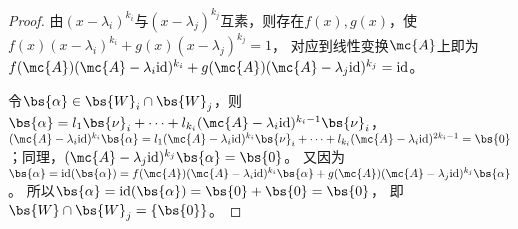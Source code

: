 \documentclass[12pt, a4paper, oneside, UTF8]{ctexbook}
\begin{document}
\begin{proof}
    由$(x-\lambda_i)^{k_i}$与$(x-\lambda_j)^{k_j}$互素，则存在$f(x),g(x)$，使$f(x)(x-\lambda_i)^{k_i}+g(x)(x-\lambda_j)^{k_j}=1$，
    对应到线性变换$\mc{A}$上即为$f(\mc{A})(\mc{A}-\lambda_i\mathrm{id})^{k_i}+g(\mc{A})(\mc{A}-\lambda_j\mathrm{id})^{k_j}=\mathrm{id}$。
    
    令$\bs{\alpha} \in \bs{W}_i \cap \bs{W}_j$，则$\bs{\alpha}=l_1\bs{\nu}_i+\cdots+l_{k_i}(\mc{A}-\lambda_i\mathrm{id})^{k_i-1}\bs{\nu}_i$，
    $(\mc{A}-\lambda_i\mathrm{id})^{k_i}\bs{\alpha}=l_1(\mc{A}-\lambda_i\mathrm{id})^{k_i} \bs{\nu}_i+\cdots+l_{k_i}(\mc{A}-\lambda_i\mathrm{id})^{2k_i-1}=\bs{0}$；同理，$(\mc{A}-\lambda_j\mathrm{id})^{k_j}\bs{\alpha}=\bs{0}$。
    又因为$\bs{\alpha}=\mathrm{id}(\bs{\alpha})=f(\mc{A})(\mc{A}-\lambda_i\mathrm{id})^{k_i}\bs{\alpha}+g(\mc{A})(\mc{A}-\lambda_j\mathrm{id})^{k_j}\bs{\alpha}$。
    所以$\bs{\alpha}=\mathrm{id}(\bs{\alpha})=\bs{0}+\bs{0}=\bs{0}$，
    即$\bs{W} \cap \bs{W}_j =\{\bs{0}\}$。
\end{proof}
\ifx\allfiles\undefined
\end{document}

